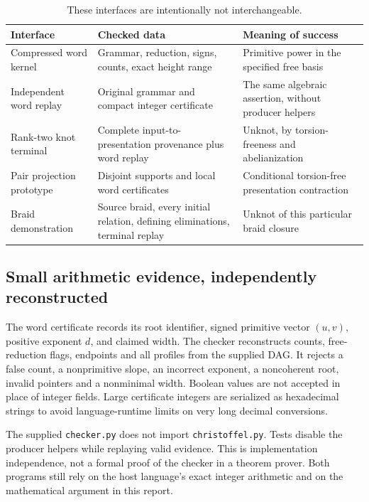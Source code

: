 \documentclass[11pt,letterpaper]{article}
\theoremstyle{definition}
\begin{document}
\begin{table}[ht]
\centering\small
\begin{tabular}{p{}p{}p{}}
\toprule
Interface & Checked data & Meaning of success \\
\midrule
Compressed word kernel & Grammar, reduction, signs, counts, exact height range & Primitive power in the specified free basis \\
Independent word replay & Original grammar and compact integer certificate & The same algebraic assertion, without producer helpers \\
Rank-two knot terminal & Complete input-to-presentation provenance plus word replay & Unknot, by torsion-freeness and abelianization \\
Pair projection prototype & Disjoint supports and local word certificates & Conditional torsion-free presentation contraction \\
Braid demonstration & Source braid, every initial relation, defining eliminations, terminal replay & Unknot of this particular braid closure \\
\bottomrule
\end{tabular}
\caption{These interfaces are intentionally not interchangeable.}
\label{tab:interfaces}
\end{table}

\subsection{Small arithmetic evidence, independently reconstructed}
The word certificate records its root identifier, signed primitive vector
$(u,v)$, positive exponent $d$, and claimed width. The checker reconstructs
counts, free-reduction flags, endpoints and all profiles from the supplied
DAG. It rejects a false count, a nonprimitive slope, an incorrect exponent,
a noncoherent root, invalid pointers and a nonminimal width. Boolean values
are not accepted in place of integer fields. Large certificate integers
are serialized as hexadecimal strings to avoid language-runtime limits on
very long decimal conversions.

The supplied \texttt{checker.py} does not import \texttt{christoffel.py}.
Tests disable the producer helpers while replaying valid evidence. This is
implementation independence, not a formal proof of the checker in a theorem
prover. Both programs still rely on the host language's exact integer
arithmetic and on the mathematical argument in this report.
\end{document}
